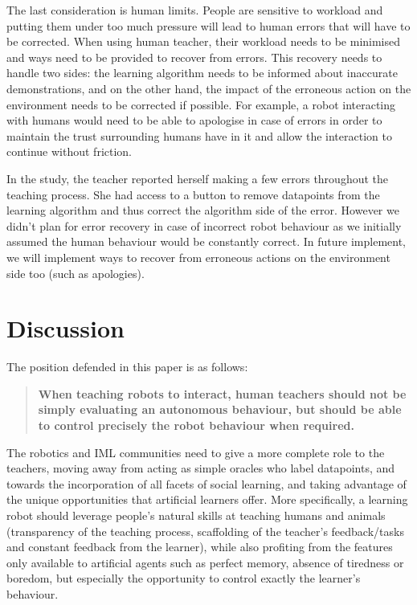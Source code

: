 \documentclass[letterpaper, 10 pt, conference]{ieeeconf}  %
\begin{document}
The last consideration is human limits. People are sensitive to workload and putting them under too much pressure will lead to human errors that will have to be corrected. When using human teacher, their workload needs to be minimised and ways need to be provided to recover from errors. This recovery needs to handle two sides: the learning algorithm needs to be informed about inaccurate demonstrations, and on the other hand, the impact of the erroneous action on the environment needs to be corrected if possible.
For example, a robot interacting with humans would need to be able to apologise in case of errors in order to maintain the trust surrounding humans have in it and allow the interaction to continue without friction.

In the study, the teacher reported herself making a few errors throughout the teaching process. She had access to a button to remove datapoints from the learning algorithm and thus correct the algorithm side of the error. However we didn't plan for error recovery in case of incorrect robot behaviour as we initially assumed the human behaviour would be constantly correct. In future implement, we will implement ways to recover from erroneous actions on the environment side too (such as apologies).

\section{Discussion}
The position defended in this paper is as follows:
\begin{quote}
    \textbf{When teaching robots to interact, human teachers should not be simply evaluating an autonomous behaviour, but should be able to control precisely the robot behaviour when required.} %
\end{quote}

The robotics and IML communities need to give a more complete role to the teachers, moving away from acting as simple oracles who label datapoints, and towards the incorporation of all facets of social learning, and taking advantage of the unique opportunities that artificial learners offer. More specifically, a learning robot should leverage people's natural skills at teaching humans and animals (transparency of the teaching process, scaffolding of the teacher's feedback/tasks and constant feedback from the learner), while also profiting from the features only available to artificial agents such as perfect memory, absence of tiredness or boredom, but especially the opportunity to control exactly the learner's behaviour. 
\end{document}
